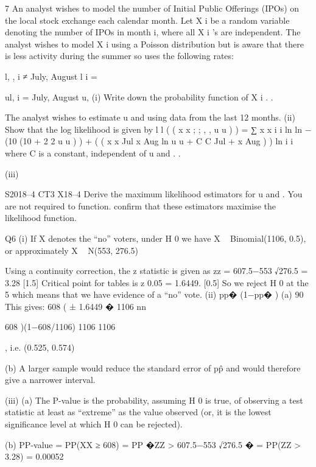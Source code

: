 7
An analyst wishes to model the number of Initial Public Offerings (IPOs) on the
local stock exchange each calendar month. Let X i be a random variable denoting the
number of IPOs in month i, where all X i ’s are independent. The analyst wishes to
model X i using a Poisson distribution but is aware that there is less activity during the
summer so uses the following rates:
{
l,
\lambda,
i ≠ July, August
\lambda
l i =
		
ul,
i = July, August
u\lambda,
(i)
Write down the probability function of X i . .

The analyst wishes to estimate u and \lambda using data from the last 12 months.
(ii)
Show that the log likelihood is given by
l l ( ( x x ; ; \lambda , , u u ) ) = ∑ x x i i ln
ln \lambda − (10
(10 + 2 2 u u ) ) \lambda + ( ( x x Jul
x Aug
ln u u + C
C
Jul + x
Aug ) ) ln
i i
where C is a constant, independent of u and \lambda.
\lambda.

(iii)

S2018–4
CT3 X18–4
Derive the maximum likelihood estimators for u and \lambda. You are not required to
function.
confirm that these estimators maximise the likelihood function.


\newpage

Q6
(i)
If X denotes the “no” voters, under H 0 we have
X ~ Binomial(1106, 0.5), or approximately X ~ N(553, 276.5)

Using a continuity correction, the z statistic is given as
zz =
607.5−553
√276.5
= 3.28
[1.5]
Critical point for tables is z 0.05 = 1.6449.
[0.5]
So we reject H 0 at the 5%
which means that we have evidence of a “no” vote.
(ii)
pp� (1−pp� )
(a) 90%
This gives:
608
(
± 1.6449 �
1106
nn

608
)(1−608/1106)
1106
1106

, i.e. (0.525, 0.574)

(b) A larger sample would reduce the standard error of pp̂ and would therefore give a
narrower interval.

(iii)
(a) The P-value is the probability, assuming H 0 is true, of observing a test statistic at
least as “extreme” as the value observed (or, it is the lowest significance level at
which H 0 can be rejected).

(b) PP-value = PP(XX ≥ 608) = PP �ZZ >
607.5−553
√276.5
� = PP(ZZ > 3.28) = 0.00052

}
